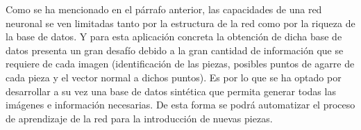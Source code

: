 Como se ha mencionado en el párrafo anterior, las capacidades de una red neuronal se ven limitadas tanto por la estructura de la red como por la riqueza de la base de datos. Y para esta aplicación concreta la obtención de dicha base de datos presenta un gran desafío debido a la gran cantidad de información que se requiere de cada imagen (identificación de las piezas, posibles puntos de agarre de cada pieza y el vector normal a dichos puntos). Es por lo que se ha optado por desarrollar a su vez una base de datos sintética que permita generar todas las imágenes e información necesarias. De esta forma se podrá automatizar el proceso de aprendizaje de la red para la introducción de nuevas piezas.